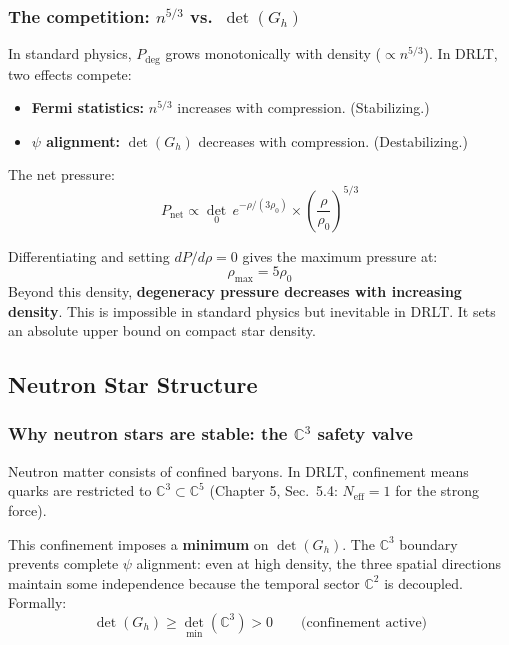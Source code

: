 \documentclass[12pt]{article}
\theoremstyle{remark}
\theoremstyle{definition}
\newcommand{\CC}{\mathbb{C}}
\begin{document}
\subsubsection{The competition: $n^{5/3}$ vs.\ $\det(G_h)$}

In standard physics, $P_\text{deg}$ grows monotonically with density ($\propto n^{5/3}$). In DRLT, two effects compete:
\begin{itemize}
\item \textbf{Fermi statistics:} $n^{5/3}$ increases with compression. (Stabilizing.)
\item \textbf{$\psi$ alignment:} $\det(G_h)$ decreases with compression. (Destabilizing.)
\end{itemize}

The net pressure:
\begin{equation}
P_\text{net} \propto \det_0\,e^{-\rho/(3\rho_0)} \times \left(\frac{\rho}{\rho_0}\right)^{5/3}
\end{equation}

Differentiating and setting $dP/d\rho = 0$ gives the maximum pressure at:
\begin{equation}
\rho_\text{max} = 5\rho_0
\end{equation}
Beyond this density, \textbf{degeneracy pressure decreases with increasing density}. This is impossible in standard physics but inevitable in DRLT. It sets an absolute upper bound on compact star density.

\subsection{Neutron Star Structure}

\subsubsection{Why neutron stars are stable: the $\CC^3$ safety valve}

Neutron matter consists of confined baryons. In DRLT, confinement means quarks are restricted to $\CC^3 \subset \CC^5$ (Chapter 5, Sec.~5.4: $N_\text{eff} = 1$ for the strong force).

This confinement imposes a \textbf{minimum} on $\det(G_h)$. The $\CC^3$ boundary prevents complete $\psi$ alignment: even at high density, the three spatial directions maintain some independence because the temporal sector $\CC^2$ is decoupled. Formally:
\begin{equation}
\det(G_h) \geq \det_\text{min}(\CC^3) > 0 \qquad \text{(confinement active)}
\end{equation}
\end{document}
